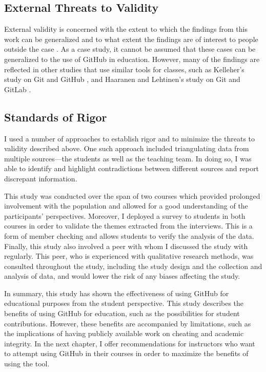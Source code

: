 \subsection{External Threats to Validity}
External validity is concerned with the extent to which the findings from this work can be generalized and to what extent the findings are of interest to people outside the case \cite{runeson2012case}. As a case study, it cannot be assumed that these cases can be generalized to the use of GitHub in education. However, many of the findings are reflected in other studies that use similar tools for classes, such as Kelleher's study on Git and GitHub \cite{kelleher2014employing}, and Haaranen and Lehtinen's study on Git and GitLab \cite{haaranen2015teaching}. %

\subsection{Standards of Rigor}
I used a number of approaches\cite{runeson2012case} to establish rigor and to minimize the threats to validity described above. One such approach included triangulating data from multiple sources---the students as well as the teaching team. In doing so, I was able to identify and highlight contradictions between different sources and report discrepant information.

This study was conducted over the span of two courses which provided prolonged involvement with the population and allowed for a good understanding of the participants' perspectives. Moreover, I deployed a survey to students in both courses in order to validate the themes extracted from the interviews. This is a form of member checking and allows students to verify the analysis of the data. Finally, this study also involved a peer with whom I discussed the study with regularly. This peer, who is experienced with qualitative research methods, was consulted throughout the study, including the study design and the collection and analysis of data, and would lower the risk of any biases affecting the study.

In summary, this study has shown the effectiveness of using GitHub for educational purposes from the student perspective. This study describes the benefits of using GitHub for education, such as the possibilities for student contributions. However, these benefits are accompanied by limitations, such as the implications of having publicly available work on cheating and academic integrity. In the next chapter, I offer recommendations for instructors who want to attempt using GitHub in their courses in order to maximize the benefits of using the tool.

